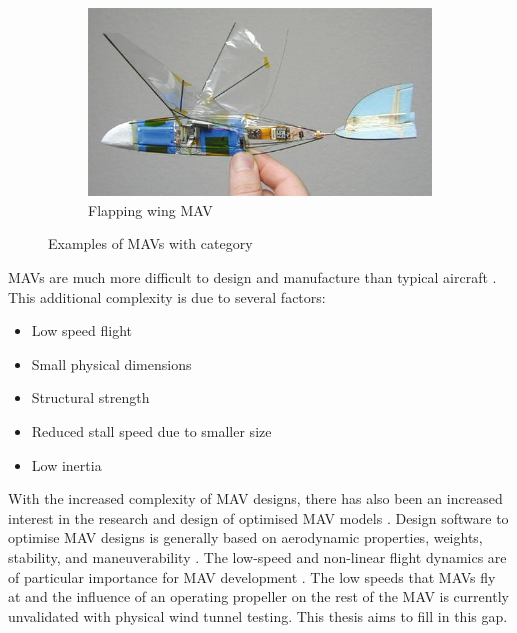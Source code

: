 \begin{figure}[H]
     \begin{subfigure}[b]{0.3\textwidth}
         \centering
         \includegraphics[width=\textwidth]{01_Introduction/Figs/flapping.jpg}
         \caption{Flapping wing \acrshort{MAV} \cite{Jones2015}}
     \end{subfigure}
        \caption{Examples of \acrshort{MAV}s with category}
        \label{fig:threeDesigns}
\end{figure}


\acrshort{MAV}s are much more difficult to design and manufacture than typical aircraft  \cite{Ward2017}. This additional complexity is due to several factors:
\begin{itemize}
  \item Low speed flight
  \item Small physical dimensions
  \item Structural strength
  \item Reduced stall speed due to smaller size
  \item Low inertia
\end{itemize}



With the increased complexity of \acrshort{MAV} designs, there has also been an increased interest in the research and design of optimised \acrshort{MAV} models \cite{Ward2017}. Design software to optimise \acrshort{MAV} designs is generally based on aerodynamic properties, weights, stability, and maneuverability \cite{Amadori2012, Vijayanandh2019, Radmanesh2014}. The low-speed and non-linear flight dynamics are of particular importance for \acrshort{MAV} development \cite{Aboelezz2020, Aboelezz2021}. The low speeds that \acrshort{MAV}s fly at and the influence of an operating propeller on the rest of the \acrshort{MAV} is currently unvalidated with physical wind tunnel testing. This thesis aims to fill in this gap.

